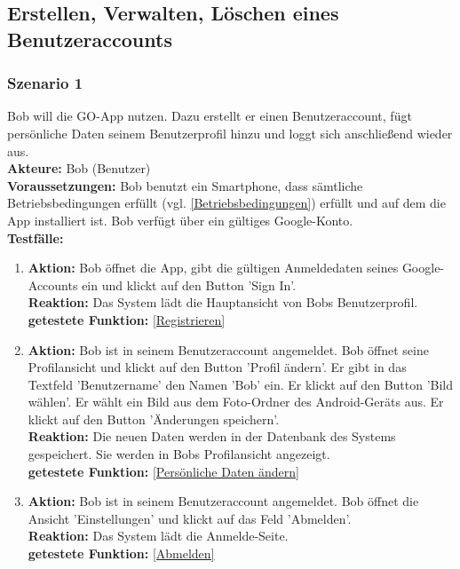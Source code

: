 \documentclass[parskip=full]{scrartcl}
\def\threedigits#1{%
  \ifnum#1<100 0\fi
  \ifnum#1<10 0\fi
  \number#1}
\begin{document}
\subsection{Erstellen, Verwalten, Löschen eines Benutzeraccounts}

\subsubsection*{Szenario 1}Bob will die GO-App nutzen. Dazu erstellt er einen Benutzeraccount, fügt persönliche Daten seinem Benutzerprofil hinzu und loggt sich anschließend wieder aus.\\

\textbf{Akteure:} Bob (Benutzer) \\

\textbf{Voraussetzungen: }Bob benutzt ein Smartphone, dass sämtliche Betriebsbedingungen erfüllt (vgl. \ref{Betriebsbedingungen}) erfüllt und auf dem die App installiert ist. Bob verfügt über ein gültiges Google-Konto.\\

\textbf{Testfälle:}
\begin{enumerate}[label={\textbf{/T\protect\threedigits{\theenumi}0/}}, leftmargin=*]
	\item\label{Registrieren-Test} \textbf{Aktion:} Bob öffnet die App, gibt die gültigen Anmeldedaten seines Google-Accounts ein und klickt auf den Button 'Sign In'. \\
									\textbf{Reaktion:} Das System lädt die Hauptansicht von Bobs Benutzerprofil.\\
									\textbf{getestete Funktion: }\ref{Registrieren}
	\item \textbf{Aktion:} Bob ist in seinem Benutzeraccount angemeldet. Bob öffnet seine Profilansicht und klickt auf den Button 'Profil ändern'. Er gibt in das Textfeld 'Benutzername' den Namen 'Bob' ein. Er klickt auf den Button 'Bild wählen'. Er wählt ein Bild aus dem Foto-Ordner des Android-Geräts aus. Er klickt auf den Button 'Änderungen speichern'. \\
		  \textbf{Reaktion:} Die neuen Daten werden in der Datenbank des Systems gespeichert. Sie werden in Bobs Profilansicht angezeigt.\\
		  \textbf{getestete Funktion: }\ref{Persönliche Daten ändern}
	\item \textbf{Aktion:} Bob ist in seinem Benutzeraccount angemeldet. Bob öffnet die Ansicht 'Einstellungen' und klickt auf das Feld 'Abmelden'.\\
		  \textbf{Reaktion:} Das System lädt die Anmelde-Seite.\\
		  \textbf{getestete Funktion: }\ref{Abmelden}
\end{enumerate}
\end{document}
